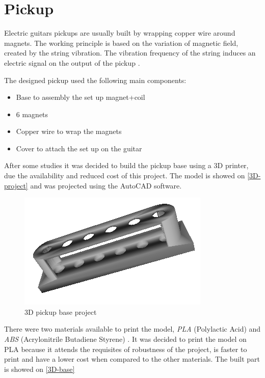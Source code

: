 \section{Pickup}
\label{pickup}

Electric guitars pickups are usually built by wrapping copper wire around magnets.
The working principle is based on the variation of magnetic field, created by the string
vibration. The vibration frequency of the string induces an electric signal on the output of the pickup
\cite{pickup-work, faraday-law}.

The designed pickup used the following main components:

\begin{itemize}
  \item Base to assembly the set up magnet+coil
  \item 6 magnets
  \item Copper wire to wrap the magnets
  \item Cover to attach the set up on the guitar
\end{itemize}

After some studies it was decided to build the pickup base using a 3D printer, due the
availability and reduced cost of this project. The model is showed on \autoref{3D-project}
and was projected using the AutoCAD software.

\begin{figure}[!htpb]
\centering
\caption{3D pickup base project}
\label{3D-project}
\includegraphics[scale=0.5]{images/pickup}
\end{figure}

There were two materials available to print the model, \textit{PLA} (Polylactic Acid)
and \textit{ABS} (Acrylonitrile Butadiene Styrene) \cite{3d-materials}. It was decided to print
the model on PLA because it attends the requisites of robustness of the project, is
faster to print and have a lower cost when compared to the other materials. The built part is showed on
\autoref{3D-base}

